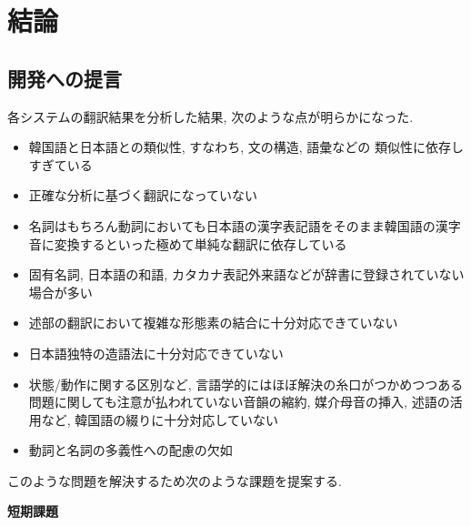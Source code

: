 \section{結論}

\subsection{開発への提言}

各システムの翻訳結果を分析した結果, 次のような点が明らかになった. 

\begin{itemize}
\item
韓国語と日本語との類似性, すなわち, 文の構造, 語彙などの 類似性に依存しすぎている
\item
正確な分析に基づく翻訳になっていない 
\item
名詞はもちろん動詞においても日本語の漢字表記語をそのまま韓国語の漢字音に変換するといった極めて単純な翻訳に依存している
\item
固有名詞, 日本語の和語, カタカナ表記外来語などが辞書に登録されていない場合が多い
\item
述部の翻訳において複雑な形態素の結合に十分対応できていない
\item
日本語独特の造語法に十分対応できていない
\item
状態/動作に関する区別など, 言語学的にはほぼ解決の糸口がつかめつつある問題に関しても注意が払われていない音韻の縮約, 
媒介母音の挿入, 述語の活用など, 韓国語の綴りに十分対応していない
\item
動詞と名詞の多義性への配慮の欠如
\end{itemize}

\newpage

\begin{flushleft}
このような問題を解決するため次のような課題を提案する. 
\end{flushleft}

\begin{flushleft}
{\bf 短期課題}
\end{flushleft}

